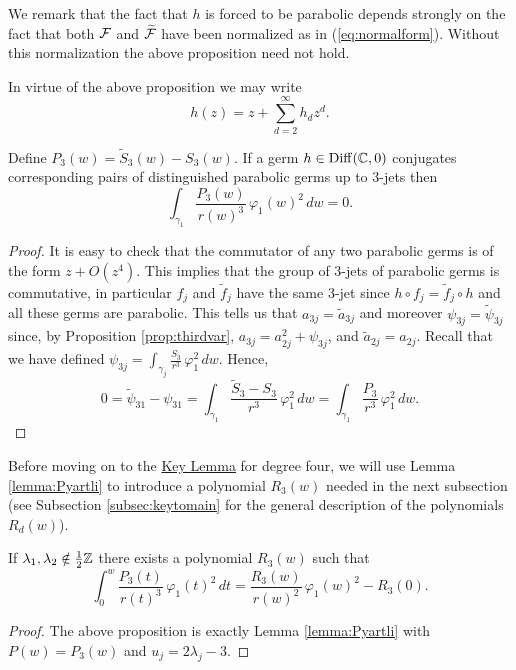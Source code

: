 We remark that the fact that $h$ is forced to be parabolic depends strongly on the fact that both $\mathcal{F}$ and $\widetilde{\mathcal{F}}$ have been normalized as in (\ref{eq:normalform}). Without this normalization the above proposition need not hold.

In virtue of the above proposition we may write
\[ h(z)=z+\sum_{d=2}^{\infty}h_dz^d. \]


\begin{proposition}\label{prop:key3}
Define $P_3(w)=\widetilde{S}_3(w)-S_3(w)$. If a germ $h\in\operatorname{Diff}(\mathbb{C},0)$ conjugates corresponding pairs of distinguished parabolic germs up to $3$-jets then
\[ \int_{\gamma_1}\frac{P_3(w)}{r(w)^3}\,\varphi_1(w)^2\,dw=0. \]
\end{proposition}

\begin{proof}
It is easy to check that the commutator of any two parabolic germs is of the form $z+O(z^4)$. This implies that the group of 3-jets of parabolic germs is commutative, in particular $f_j$ and $\tilde{f}_j$ have the same 3-jet since $h\circ f_j=\tilde{f}_j\circ h$ and all these germs are parabolic. This tells us that $a_{3j}=\tilde{a}_{3j}$ and moreover $\psi_{3j}=\widetilde{\psi}_{3j}$ since, by Proposition \ref{prop:thirdvar},  $a_{3j}=a_{2j}^2+\psi_{3j}$, and $\tilde{a}_{2j}=a_{2j}$. Recall that we have defined $\psi_{3j}=\int_{\gamma_j}\frac{S_3}{r^3}\,\varphi_1^2\,dw$. Hence,
\[0=\widetilde{\psi}_{31}-\psi_{31}=\int_{\gamma_1}\frac{\widetilde{S}_3-S_3}{r^3}\,\varphi_1^2\,dw=\int_{\gamma_1}\frac{P_3}{r^3}\,\varphi_1^2\,dw. \]
\end{proof}

Before moving on to the \hyperref[lemma:key]{Key Lemma} for degree four, we will use Lemma \ref{lemma:Pyartli} to introduce a polynomial $R_3(w)$ needed in the next subsection (see Subsection \ref{subsec:keytomain} for the general description of the polynomials $R_d(w)$).

\begin{proposition}\label{prop:R3}
If $\lambda_1,\lambda_2\notin\frac{1}{2}\mathbb{Z}$ there exists a polynomial $R_3(w)$ such that 
\[ \int_0^w\frac{P_3(t)}{r(t)^3}\,\varphi_1(t)^2\,dt=\frac{R_3(w)}{r(w)^2}\,\varphi_1(w)^2-R_3(0). \]
\end{proposition}

\begin{proof}
The above proposition is exactly Lemma \ref{lemma:Pyartli} with $P(w)=P_3(w)$ and $u_j=2\lambda_j-3$.
\end{proof}









